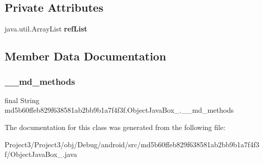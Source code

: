 \subsection*{Private Attributes}
\begin{DoxyCompactItemize}
\item 
\mbox{\label{classmd5b60ffeb829f638581ab2bb9b1a7f4f3f_1_1ObjectJavaBox__1_a2b744b25a4e0536e5ab583cdd3eefe36}} 
java.\+util.\+Array\+List {\bfseries ref\+List}
\end{DoxyCompactItemize}


\subsection{Member Data Documentation}
\mbox{\label{classmd5b60ffeb829f638581ab2bb9b1a7f4f3f_1_1ObjectJavaBox__1_a71c23a08d05ad66171fa5a28f857587d}} 
\subsubsection{\texorpdfstring{\+\_\+\+\_\+md\+\_\+methods}{\_\_md\_methods}}
{\footnotesize\ttfamily final String md5b60ffeb829f638581ab2bb9b1a7f4f3f.\+Object\+Java\+Box\+\_.\+\_\+\+\_\+md\+\_\+methods\hspace{0.3cm}{\ttfamily [static]}}



The documentation for this class was generated from the following file\+:\begin{DoxyCompactItemize}
\item 
Project3/\+Project3/obj/\+Debug/android/src/md5b60ffeb829f638581ab2bb9b1a7f4f3f/Object\+Java\+Box\+\_.\+java\end{DoxyCompactItemize}

